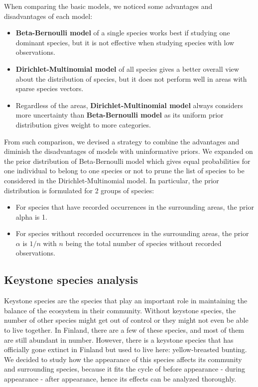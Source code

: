 \documentclass{article}
\begin{document}
When comparing the basic models, we noticed some advantages and disadvantages of each model:
\begin{itemize}
	\item \textbf{Beta-Bernoulli model} of a single species works best if studying one dominant species, but it is not effective when studying species with low observations.
	\item \textbf{Dirichlet-Multinomial model} of all species gives a better overall view about the distribution of species, but it does not perform well in areas with sparse species vectors.
	\item Regardless of the areas, \textbf{Dirichlet-Multinomial model} always considers more uncertainty than \textbf{Beta-Bernoulli model} as its uniform prior distribution gives weight to more categories.
\end{itemize}
From such comparison, we devised a strategy to combine the advantages and diminish the disadvantages of models with uninformative priors. We expanded on the prior distribution of Beta-Bernoulli model which gives equal probabilities for one individual to belong to one species or not to prune the list of species to be considered in the Dirichlet-Multinomial model. In particular, the prior distribution is formulated for 2 groups of species:
\begin{itemize}
	\item For species that have recorded occurrences in the surrounding areas, the prior alpha is 1.
	\item For species without recorded occurrences in the surrounding areas, the prior $\alpha$ is $1/n$ with $n$ being the total number of species without recorded observations.
\end{itemize}

\subsection{Keystone species analysis}
Keystone species are the species that play an important role in maintaining the balance of the ecosystem in their community. Without keystone species, the number of other species might get out of control or they might not even be able to live together. In Finland, there are a few of these species, and most of them are still abundant in number. However, there is a keystone species that has officially gone extinct in Finland but used to live here: yellow-breasted bunting. We decided to study how the appearance of this species affects its community and surrounding species, because it fits the cycle of before appearance - during appearance - after appearance, hence its effects can be analyzed thoroughly.
\end{document}

